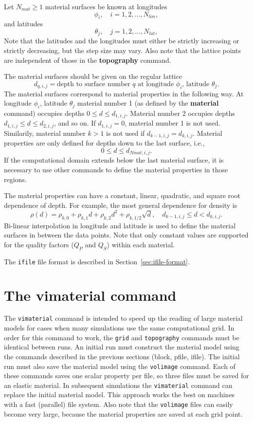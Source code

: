 \documentclass[11pt]{report}
\begin{document}
{Let $N_{mat}\geq 1$ material surfaces be known at longitudes
\[
	\phi_i,\quad i=1,2,\ldots,N_{lon},
\]
and latitudes
\[
	\theta_j,\quad j=1,2,\ldots,N_{lat},
\]
Note that the latitudes and the longitudes must either be strictly increasing or strictly
decreasing, but the step size may vary. Also note that the lattice points are independent of those
in the {\bf topography} command.

The material surfaces should be given on the regular lattice
\[
	d_{q,i,j} = \mbox{depth to surface number $q$ at longitude $\phi_i$, latitude $\theta_j$.}
\]
The material surfaces correspond to material properties in the following way. At longitude $\phi_i$,
latitude $\theta_j$ material number 1 (as defined by the {\bf material} command) occupies depths
$0\leq d \leq d_{1,i,j}$. Material number 2 occupies depths $d_{1,i,j} \leq d \leq d_{2,i,j}$, and
so on. If $d_{1,i,j}=0$, material number 1 is not used. Similarily, material number $k>1$ is not
used if $d_{k-1,i,j} = d_{k,i,j}$. Material properties are only defined for depths down to the last
surface, i.e.,
\[
	0\leq d \leq d_{Nmat,i,j}.
\]
If the computational domain extends below the last material surface, it is necessary to use other
commands to define the material properties in those regions.

The material properties can have a constant, linear, quadratic, and square root dependence of
depth. For example, the most general dependence for density is
\[
	\rho(d) = \rho_{k,0} + \rho_{k,1} d + \rho_{k,2} d^2 + \rho_{k,1/2} \sqrt{d},\quad d_{k-1,i,j} \leq d < d_{k,i,j}.
\]
Bi-linear interpolation in longitude and latitude is used to define the material surfaces in between
the data points. Note that only constant values are supported for the quality factors
($Q_P$ and $Q_S$) within each material.

The \verb+ifile+ file format is described in Section~\ref{sec:ifile-format}.

\section{The vimaterial command}\label{sec:vimat}

The \verb+vimaterial+ command is intended to speed up the reading of large material models for cases
when many simulations use the same computational grid. In order for this command to work, the
\verb+grid+ and \verb+topography+ commands must be identical between runs. An initial run must
construct the material model using the commands described in the previous sections (block,
pfile, ifile). The initial run must also save the material model using the \verb+volimage+
command. Each of these commands saves one scalar property per file, so three files must be saved for
an elastic material. In subsequent simulations the \verb+vimaterial+ command can replace the initial
material model. This approach works the best on machines with a fast (parallel) file system. Also
note that the \verb+volimage+ files can easily become very large, because the material properties
are saved at each grid point.

}
\end{document}
